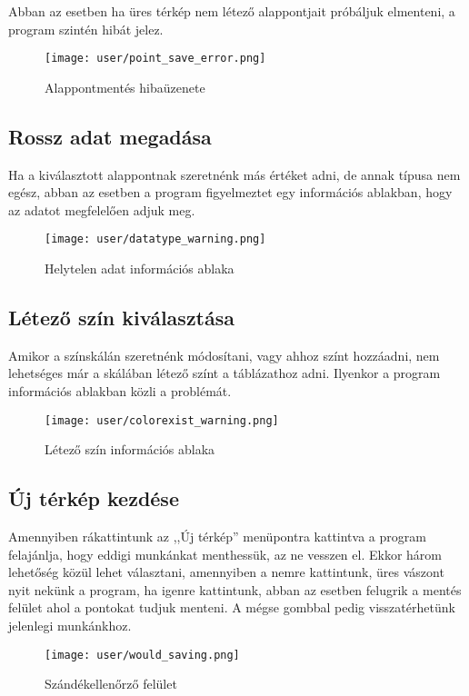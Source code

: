 			Abban az esetben ha üres térkép nem létező alappontjait próbáljuk elmenteni, a program szintén hibát jelez. 
			\begin{figure}[ht]
				\centering
				\texttt{[image: user/point\_save\_error.png]}
				\caption{Alappontmentés hibaüzenete}
			\end{figure}
		\subsection{Rossz adat megadása}
			Ha a kiválasztott alappontnak szeretnénk más értéket adni, de annak típusa nem egész, abban az esetben a program figyelmeztet egy információs ablakban, hogy az adatot megfelelően adjuk meg.
			\begin{figure}[ht]
				\centering
				\texttt{[image: user/datatype\_warning.png]}
				\caption{Helytelen adat információs ablaka}
			\end{figure}
		\subsection{Létező szín kiválasztása}
			Amikor a színskálán szeretnénk módosítani, vagy ahhoz színt hozzáadni, nem lehetséges már a skálában létező színt a táblázathoz adni. Ilyenkor a program információs ablakban közli a problémát.
			\begin{figure}[ht]
				\centering
				\texttt{[image: user/colorexist\_warning.png]}
				\caption{Létező szín információs ablaka}
				\label{fig:colorwarning}
			\end{figure}
		\subsection{Új térkép kezdése}
		
			Amennyiben rákattintunk az ,,Új térkép'' menüpontra kattintva a program felajánlja, hogy eddigi munkánkat menthessük, az ne vesszen el. Ekkor három lehetőség közül lehet választani, amennyiben a nemre kattintunk, üres vászont nyit nekünk a program, ha igenre kattintunk, abban az esetben felugrik a mentés felület ahol a pontokat tudjuk menteni. A mégse gombbal pedig visszatérhetünk jelenlegi munkánkhoz.
			\begin{figure}[ht]
				\centering
				\texttt{[image: user/would\_saving.png]}
				\caption{Szándékellenőrző felület}
				\label{fig:colorwarning}
			\end{figure}